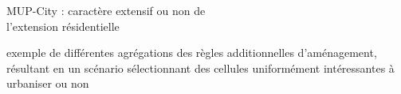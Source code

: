 \documentclass[xcolor=table]{beamer}
\begin{document}

\begin{frame}{MUP-City : caractère extensif ou non de \\l'extension résidentielle}
	\vspace{1cm}
	\hspace*{-0.5cm}
	
	{\footnotesize exemple de différentes agrégations des règles additionnelles d'aménagement, résultant en un scénario sélectionnant des cellules uniformément intéressantes à urbaniser ou non}
\end{frame}
\end{document}
